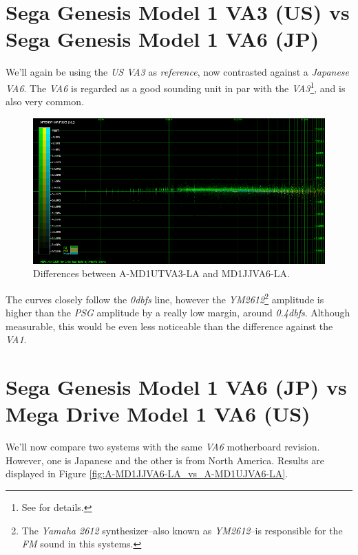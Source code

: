 \documentclass[10pt,a4paper]{report}
\newcommand{\db}[1]{\textit{#1\acrshort{dbfs}}}
\begin{document}
\section{Sega Genesis Model 1 VA3 (US) vs\\ Sega Genesis Model 1 VA6 (JP)}

We'll again be using the \textit{US VA3} as \textit{reference}, now contrasted against a \textit{Japanese VA6}. The \textit{VA6} is regarded as a good sounding unit in par with the \textit{VA3}\footnote{See \cite{genesisaudio} for details.}, and is also very common. 

\begin{figure}[H]
	\centering
	\includegraphics[width=1.0\linewidth]{images/results/2-A-MD1UTVA3-LA_vs_A-MD1JJVA6-LA.png}
	\caption[A-MD1UTVA3-LA vs A-MD1JJVA6-LA]{Differences between A-MD1UTVA3-LA and MD1JJVA6-LA.}
	\label{fig:A-MD1UTVA3-LA_vs_A-MD1JJVA6-LA}
\end{figure}

The curves closely follow the \db{0} line, however the \textit{YM2612}\footnote{The \textit{Yamaha 2612} synthesizer--also known as \textit{YM2612}--is responsible for the \textit{FM} sound in this systems.} amplitude is higher than the \textit{PSG} amplitude by a really low margin, around \db{0.4}. Although measurable, this would be even less noticeable than the difference against the \textit{VA1}.

\section{Sega Genesis Model 1 VA6 (JP) vs\\ Mega Drive Model 1 VA6 (US)}

We'll now compare two systems with the same \textit{VA6} motherboard revision. However, one is Japanese and the other is from North America. Results are displayed in Figure \ref{fig:A-MD1JJVA6-LA_vs_A-MD1UJVA6-LA}.
\end{document}
